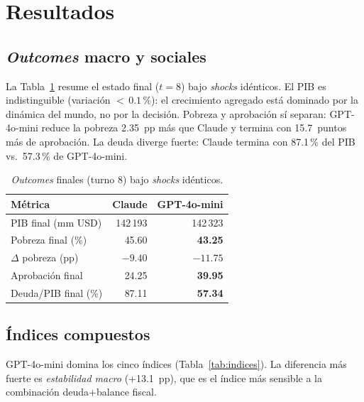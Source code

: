 \documentclass[conference]{IEEEtran}
\begin{document}
\section{Resultados}

\subsection{\emph{Outcomes} macro y sociales}

La Tabla~\ref{tab:outcomes} resume el estado final ($t{=}8$) bajo
\emph{shocks} id\'enticos. El PIB es indistinguible (variaci\'on
$<\,0.1\,\%$): el crecimiento agregado est\'a dominado por la
din\'amica del mundo, no por la decisi\'on. Pobreza y aprobaci\'on
s\'i separan: GPT-4o-mini reduce la pobreza 2.35~pp m\'as que Claude y
termina con 15.7~puntos m\'as de aprobaci\'on. La deuda diverge
fuerte: Claude termina con 87.1\,\% del PIB vs.\ 57.3\,\% de
GPT-4o-mini.

\begin{table}[h]
\centering
\caption{\emph{Outcomes} finales (turno 8) bajo \emph{shocks} id\'enticos.}
\label{tab:outcomes}
\begin{tabular}{lrr}
\toprule
M\'etrica & Claude & GPT-4o-mini \\
\midrule
PIB final (mm USD)        & 142\,193 & 142\,323 \\
Pobreza final (\%)        & 45.60    & \textbf{43.25} \\
$\Delta$ pobreza (pp)     & $-9.40$  & $\mathbf{-11.75}$ \\
Aprobaci\'on final         & 24.25    & \textbf{39.95} \\
Deuda/PIB final (\%)      & 87.11    & \textbf{57.34} \\
\bottomrule
\end{tabular}
\end{table}

\subsection{\'Indices compuestos}

GPT-4o-mini domina los cinco \'indices (Tabla~\ref{tab:indices}). La
diferencia m\'as fuerte es \emph{estabilidad macro} (+13.1~pp), que
es el \'indice m\'as sensible a la combinaci\'on deuda$+$balance
fiscal.
\end{document}
